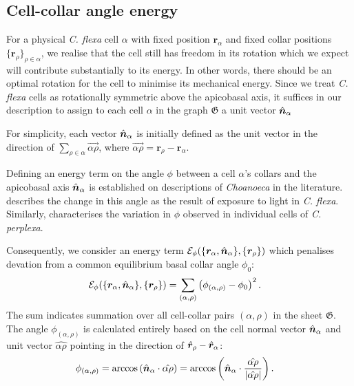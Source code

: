 \subsection{Cell-collar angle energy}
For a physical \textit{C. flexa} cell $\alpha$ with fixed position $\bm{r}_\alpha$ and fixed collar positions $\{\bm{r}_\rho\}_{\rho\in\alpha}$, we realise that the cell still has freedom in its rotation which we expect will contribute substantially to its energy. 
In other words, there should be an optimal rotation for the cell to minimise its mechanical energy. 
Since we treat \textit{C. flexa} cells as rotationally symmetric above the apicobasal axis, it suffices in our description to assign to each cell $\alpha$ in the graph $\mathfrak{G}$ a unit vector $\hat{\bm{n}}_\alpha$ 

For simplicity, each vector $\hat{\bm{n}}_\alpha$ is initially defined as the unit vector in the direction of $\sum_{\rho\in\alpha} \vec{\alpha\rho}$, where $\vec{\alpha\rho} = \bm{r}_\rho - \bm{r}_\alpha$.

Defining an energy term on the angle $\phi$ between a cell $\alpha$'s collars and the apicobasal axis $\hat{\bm{n}}_\alpha$ is established on descriptions of \textit{Choanoeca} in the literature. 
\citet{brunet2019} describes the change in this angle as the result of exposure to light in \textit{C. flexa}.
Similarly, \citet{ellis1930} characterises the variation in $\phi$ observed in individual cells of \textit{C. perplexa}.

Consequently, we consider an energy term $\mathcal{E}_\phi(\{\bm{r}_\alpha, \hat{\bm{n}}_\alpha\}, \{\bm{r}_\rho\})$ which penalises devation from a common equilibrium basal collar angle $\phi_0$:
\begin{align}
	\mathcal{E}_\phi(\{\bm{r}_\alpha, \hat{\bm{n}}_\alpha\}, \{\bm{r}_\rho\}) &= \sum_{(\alpha, \rho)} \left(\phi_{(\alpha, \rho)} - \phi_0 \right)^2. \label{eq:e_phi}
\end{align}
\noindent The sum indicates summation over all cell-collar pairs $(\alpha, \rho)$ in the sheet $\mathfrak{G}$. The angle $\phi_{(\alpha, \rho)}$ is calculated entirely based on the cell normal vector $\hat{\bm{n}}_\alpha$ and unit vector $\hat{\alpha\rho}$ pointing in the direction of $\hat{\bm{r}}_\rho - \hat{\bm{r}}_\alpha$:
\begin{align}
	\phi_{(\alpha, \rho)} &= \arccos \left(\hat{\bm{n}}_\alpha \cdot \hat{\alpha\rho} \right) = \arccos \left(\hat{\bm{n}}_\alpha \cdot \frac{\hat{\alpha\rho}}{\left| \hat{\alpha\rho}\right|} \right). \label{eq:phi}
\end{align}

